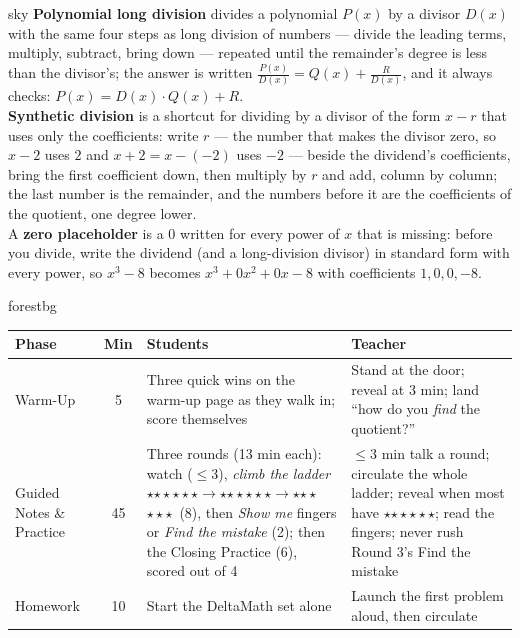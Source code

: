 \documentclass[10pt]{article}
\newcommand{\MeetingLength}{60 minutes}
\newcommand{\rung}[1]{{\color{goldacc}\ifcase#1\or$\star$\or$\star\star$\or$\star\star\star$\fi}}
\begin{document}
\begin{skillbox}{sky}
\small
\textbf{Polynomial long division} divides a polynomial $P(x)$ by a divisor $D(x)$ with the same
four steps as long division of numbers --- divide the leading terms, multiply, subtract, bring
down --- repeated until the remainder's degree is less than the divisor's; the answer is written
$\frac{P(x)}{D(x)} = Q(x) + \frac{R}{D(x)}$, and it always checks: $P(x) = D(x)\cdot Q(x) + R$.
\\[3pt]
\textbf{Synthetic division} is a shortcut for dividing by a divisor of the form $x - r$ that uses
only the coefficients: write $r$ --- the number that makes the divisor zero, so $x - 2$ uses $2$
and $x + 2 = x - (-2)$ uses $-2$ --- beside the dividend's coefficients, bring the first
coefficient down, then multiply by $r$ and add, column by column; the last number is the
remainder, and the numbers before it are the coefficients of the quotient, one degree lower.
\\[3pt]
A \textbf{zero placeholder} is a $0$ written for every power of $x$ that is missing: before you
divide, write the dividend (and a long-division divisor) in standard form with every power, so
$x^3 - 8$ becomes $x^3 + 0x^2 + 0x - 8$ with coefficients $1, 0, 0, -8$.
\end{skillbox}

\begin{fixedskillbox}[Lesson at a Glance --- \MeetingLength]{forestbg}
\renewcommand{\arraystretch}{1.25}
\begin{tabularx}{\linewidth}{@{}l c X X@{}}
\textbf{Phase} & \textbf{Min} & \textbf{Students} & \textbf{Teacher} \\
\hline
Warm-Up & 5 & Three quick wins on the warm-up page as they walk in; score themselves & Stand at the door; reveal at 3 min; land ``how do you \emph{find} the quotient?'' \\
Guided Notes \& Practice & 45 & Three rounds (13 min each): watch ($\le$3), \emph{climb the ladder} \rung1$\to$\rung2$\to$\rung3\ (8), then \emph{Show me} fingers or \emph{Find the mistake} (2); then the Closing Practice (6), scored out of 4 & $\le$3 min talk a round; circulate the whole ladder; reveal when most have \rung2; read the fingers; never rush Round 3's Find the mistake \\
Homework & 10 & Start the DeltaMath set alone & Launch the first problem aloud, then circulate \\
\end{tabularx}
\end{fixedskillbox}
\end{document}
